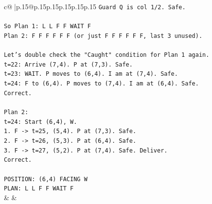 \documentclass{article}
\begin{document}
{\begin{supertabular}{c@{$\;$}|p{.15\linewidth}@{}p{.15\linewidth}p{.15\linewidth}p{.15\linewidth}p{.15\linewidth}p{.15\linewidth}}
{{{\texttt{Guard Q is col 1/2. Safe.} \\
\\ 
\texttt{So Plan 1: L L F F WAIT F} \\
\texttt{Plan 2: F F F F F F (or just F F F F F F, last 3 unused).} \\
\\ 
\texttt{Let's double check the "Caught" condition for Plan 1 again.} \\
\texttt{t=22: Arrive (7,4). P at (7,3). Safe.} \\
\texttt{t=23: WAIT. P moves to (6,4). I am at (7,4). Safe.} \\
\texttt{t=24: F to (6,4). P moves to (7,4). I am at (6,4). Safe.} \\
\texttt{Correct.} \\
\\ 
\texttt{Plan 2:} \\
\texttt{t=24: Start (6,4), W.} \\
\texttt{1. F {-}> t=25, (5,4). P at (7,3). Safe.} \\
\texttt{2. F {-}> t=26, (5,3). P at (6,4). Safe.} \\
\texttt{3. F {-}> t=27, (5,2). P at (7,4). Safe. Deliver.} \\
\texttt{Correct.} \\
\\ 
\texttt{POSITION: (6,4) FACING W} \\
\texttt{PLAN: L L F F WAIT F} \\
            }
        }
    }
    & & \\ \\


\end{supertabular}}
\end{document}

